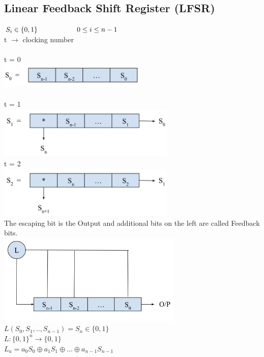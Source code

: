 \documentclass[11pt]{article}
\begin{document}
\subsection*{Linear Feedback Shift Register (LFSR)}
$S_{i} \in \{0,1\} \hspace*{2cm} 0 \leq i \leq n-1$ \\
t $ \rightarrow$ clocking number \\\\
t = 0 \\
\includegraphics[width=200pt]{p1.png} \\\\
t = 1 \\
\includegraphics[width=240pt]{p2.png} \\
t = 2 \\
\includegraphics[width=240pt]{p3.png} \\
The escaping bit is the Output and additional bits on the left are called Feedback bits. \\
\includegraphics[width=250pt]{p4.png} \\
$L(S_{0},S_{1},..,S_{n-1}) = S_{n} \in \{0,1\}$ \\
$L : \{0,1\}^{n} \rightarrow \{0,1\}$ \\
$L_{a} = a_{0}S_{0} \oplus a_{1}S_{1} \oplus ... \oplus a_{n-1}S_{n-1}$ \\
\end{document}
